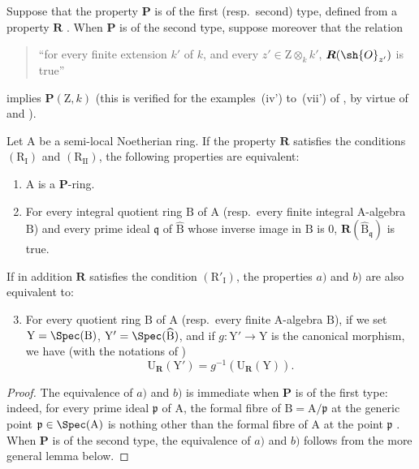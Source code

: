 \begin{proposition}[7.3.16]
\label{IV.7.3.16}
Suppose that the property $\boldsymbol{P}$ is of the first (resp.~second) type, defined from a property $\boldsymbol{R}$ .
When $\boldsymbol{P}$ is of the second type, suppose moreover that the relation
\begin{quote}
``for every finite extension $k'$ of $k$, and every $z'\in\mathrm{Z}\otimes_k k'$, $\boldsymbol{R}(\sh{O}_{z'})$ is true''
\end{quote}
implies $\boldsymbol{P}(\mathrm{Z},k)$ (this is verified for the examples~(iv') to~(vii') of , by virtue of  and ).

Let $\mathrm{A}$ be a semi-local Noetherian ring.
If the property $\boldsymbol{R}$ satisfies the conditions $(\mathrm{R_I})$ and $(\mathrm{R_{II}})$, the following properties are equivalent:
\begin{enumerate}[label=\emph{\alph*)}]
  \item $\mathrm{A}$ is a $\boldsymbol{P}$-ring.
  \item For every integral quotient ring $\mathrm{B}$ of $\mathrm{A}$ (resp.~every finite integral A-algebra $\mathrm{B}$) and every prime ideal $\mathfrak{q}$ of $\widehat{\mathrm{B}}$ whose inverse image in $\mathrm{B}$ is $0$, $\boldsymbol{R}(\widehat{\mathrm{B}}_\mathfrak{q})$ is true.
\end{enumerate}
If in addition $\boldsymbol{R}$ satisfies the condition $(\mathrm{R}'_\mathrm{I})$, the properties $a)$ and $b)$ are also equivalent to:
\begin{enumerate}[label=\emph{\alph*)}]
  \setcounter{enumi}{2}
  \item For every quotient ring $\mathrm{B}$ of $\mathrm{A}$ (resp.~every finite A-algebra $\mathrm{B}$), if we set $\mathrm{Y}=\Spec(\mathrm{B})$, $\mathrm{Y}'=\Spec(\widehat{\mathrm{B}})$, and if $g:\mathrm{Y}'\to\mathrm{Y}$ is the canonical morphism, we have (with the notations of )
  \[
    \mathrm{U}_{\boldsymbol{R}}(\mathrm{Y}')=g^{-1}(\mathrm{U}_{\boldsymbol{R}}(\mathrm{Y})).
    \label{IV.7.3.16.1}
\tag{7.3.16.1}
  \]
\end{enumerate}
\end{proposition}

\begin{proof}
The equivalence of $a)$ and $b)$ is immediate when $\boldsymbol{P}$ is of the first type: indeed, for every prime ideal $\mathfrak{p}$ of $\mathrm{A}$, the formal fibre of $\mathrm{B}=\mathrm{A}/\mathfrak{p}$ at the generic point $\mathfrak{p}\in\Spec(\mathrm{A})$ is nothing other than the formal fibre of $\mathrm{A}$ at the point $\mathfrak{p}$ .
When $\boldsymbol{P}$ is of the second type, the equivalence of $a)$ and $b)$ follows from the more general lemma below.
\end{proof}

